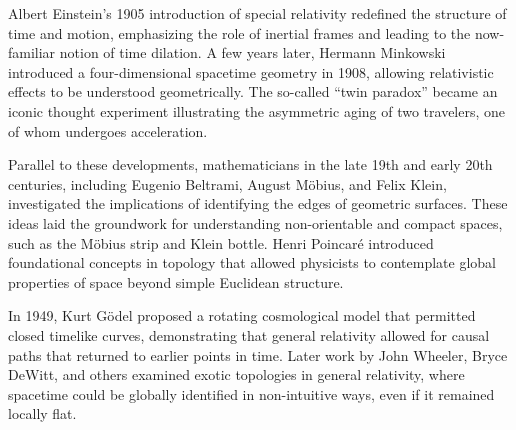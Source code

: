 \begin{historical}
Albert Einstein’s 1905 introduction of special relativity redefined the structure of time and motion, emphasizing the role of inertial frames and leading to the now-familiar notion of time dilation. A few years later, Hermann Minkowski introduced a four-dimensional spacetime geometry in 1908, allowing relativistic effects to be understood geometrically. The so-called “twin paradox” became an iconic thought experiment illustrating the asymmetric aging of two travelers, one of whom undergoes acceleration.

Parallel to these developments, mathematicians in the late 19th and early 20th centuries, including Eugenio Beltrami, August Möbius, and Felix Klein, investigated the implications of identifying the edges of geometric surfaces. These ideas laid the groundwork for understanding non-orientable and compact spaces, such as the Möbius strip and Klein bottle. Henri Poincaré introduced foundational concepts in topology that allowed physicists to contemplate global properties of space beyond simple Euclidean structure.

In 1949, Kurt Gödel proposed a rotating cosmological model that permitted closed timelike curves, demonstrating that general relativity allowed for causal paths that returned to earlier points in time. Later work by John Wheeler, Bryce DeWitt, and others examined exotic topologies in general relativity, where spacetime could be globally identified in non-intuitive ways, even if it remained locally flat.

\end{historical}
